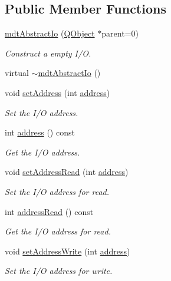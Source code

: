\subsection*{Public Member Functions}
\begin{DoxyCompactItemize}
\item 
\hyperlink{classmdt_abstract_io_ac138b89890471e0412f2b15f2c53f1f9}{mdt\-Abstract\-Io} (\hyperlink{class_q_object}{Q\-Object} $\ast$parent=0)
\begin{DoxyCompactList}\small\item\em Construct a empty I/\-O. \end{DoxyCompactList}\item 
virtual \hyperlink{classmdt_abstract_io_a5708ac197c8cd4fe6541820c34aed7a0}{$\sim$mdt\-Abstract\-Io} ()
\item 
void \hyperlink{classmdt_abstract_io_a1f3bfa0472c7e0bd4cd9a5b865c460a2}{set\-Address} (int \hyperlink{classmdt_abstract_io_a52f071b6c1098e74f82eade9ead5382a}{address})
\begin{DoxyCompactList}\small\item\em Set the I/\-O address. \end{DoxyCompactList}\item 
int \hyperlink{classmdt_abstract_io_a52f071b6c1098e74f82eade9ead5382a}{address} () const 
\begin{DoxyCompactList}\small\item\em Get the I/\-O address. \end{DoxyCompactList}\item 
void \hyperlink{classmdt_abstract_io_ac2eecb238c3eb41d124c79e6dd363424}{set\-Address\-Read} (int \hyperlink{classmdt_abstract_io_a52f071b6c1098e74f82eade9ead5382a}{address})
\begin{DoxyCompactList}\small\item\em Set the I/\-O address for read. \end{DoxyCompactList}\item 
int \hyperlink{classmdt_abstract_io_a710119785e128ca39092e99593bc7dac}{address\-Read} () const 
\begin{DoxyCompactList}\small\item\em Get the I/\-O address for read. \end{DoxyCompactList}\item 
void \hyperlink{classmdt_abstract_io_a34082150ca24fe27245ceb515de1168b}{set\-Address\-Write} (int \hyperlink{classmdt_abstract_io_a52f071b6c1098e74f82eade9ead5382a}{address})
\begin{DoxyCompactList}\small\item\em Set the I/\-O address for write. \end{DoxyCompactList}\item 

\end{DoxyCompactItemize}
